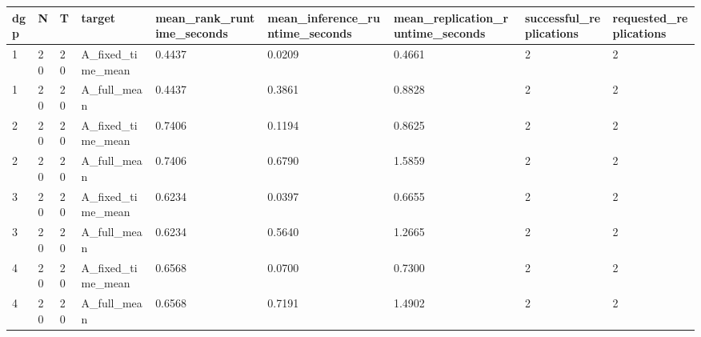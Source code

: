 \begin{tabular}{lllllllll}
\toprule
dgp & N & T & target & mean\_rank\_runtime\_seconds & mean\_inference\_runtime\_seconds & mean\_replication\_runtime\_seconds & successful\_replications & requested\_replications \\
\midrule
1 & 20 & 20 & A\_fixed\_time\_mean & 0.4437 & 0.0209 & 0.4661 & 2 & 2 \\
1 & 20 & 20 & A\_full\_mean & 0.4437 & 0.3861 & 0.8828 & 2 & 2 \\
2 & 20 & 20 & A\_fixed\_time\_mean & 0.7406 & 0.1194 & 0.8625 & 2 & 2 \\
2 & 20 & 20 & A\_full\_mean & 0.7406 & 0.6790 & 1.5859 & 2 & 2 \\
3 & 20 & 20 & A\_fixed\_time\_mean & 0.6234 & 0.0397 & 0.6655 & 2 & 2 \\
3 & 20 & 20 & A\_full\_mean & 0.6234 & 0.5640 & 1.2665 & 2 & 2 \\
4 & 20 & 20 & A\_fixed\_time\_mean & 0.6568 & 0.0700 & 0.7300 & 2 & 2 \\
4 & 20 & 20 & A\_full\_mean & 0.6568 & 0.7191 & 1.4902 & 2 & 2 \\
\bottomrule
\end{tabular}
